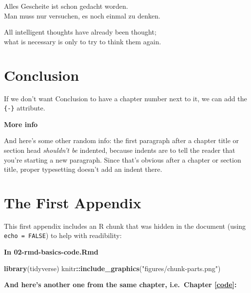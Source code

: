 \documentclass[a4paper, twoside]{templates/ociamthesis}
\newenvironment{Shaded}{\begin{snugshade}}{\end{snugshade}}
\newcommand{\KeywordTok}[1]{\textcolor[rgb]{0.13,0.29,0.53}{\textbf{#1}}}
\newcommand{\NormalTok}[1]{#1}
\newcommand{\OperatorTok}[1]{\textcolor[rgb]{0.81,0.36,0.00}{\textbf{#1}}}
\newcommand{\StringTok}[1]{\textcolor[rgb]{0.31,0.60,0.02}{#1}}
\renewenvironment{Shaded}
{
  \vspace{4pt}%
  \begin{snugshade}%
}{%
  \end{snugshade}%
  \vspace{4pt}%
}
\begin{document}
\begin{savequote}
Alles Gescheite ist schon gedacht worden.\\
Man muss nur versuchen, es noch einmal zu denken.

All intelligent thoughts have already been thought;\\
what is necessary is only to try to think them again.
\end{savequote}



\hypertarget{conclusion}{%
\chapter*{Conclusion}\label{conclusion}}

If we don't want Conclusion to have a chapter number next to it, we can add the \texttt{\{-\}} attribute.

\textbf{More info}

And here's some other random info: the first paragraph after a chapter title or section head \emph{shouldn't be} indented, because indents are to tell the reader that you're starting a new paragraph. Since that's obvious after a chapter or section title, proper typesetting doesn't add an indent there.

\startappendices

\hypertarget{the-first-appendix}{%
\chapter{The First Appendix}\label{the-first-appendix}}

This first appendix includes an R chunk that was hidden in the document (using \texttt{echo\ =\ FALSE}) to help with readibility:

\textbf{In 02-rmd-basics-code.Rmd}

\begin{Shaded}
\begin{Highlighting}[]
\KeywordTok{library}\NormalTok{(tidyverse)}
\NormalTok{knitr}\OperatorTok{::}\KeywordTok{include_graphics}\NormalTok{(}\StringTok{"figures/chunk-parts.png"}\NormalTok{)}
\end{Highlighting}
\end{Shaded}

\textbf{And here's another one from the same chapter, i.e.~Chapter \ref{code}:}
\end{document}

